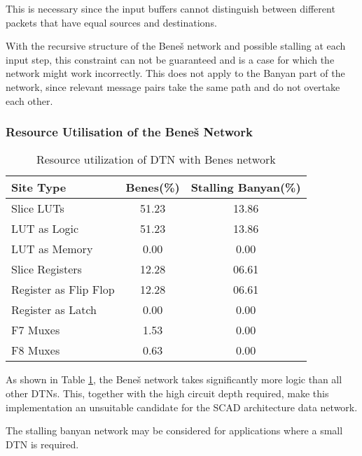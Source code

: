 	This is necessary since the input buffers cannot distinguish between different packets that have equal sources and destinations.
	
	With the recursive structure of the Beneš network and possible stalling at each input step, this constraint can not be guaranteed and is a case for which the network might work incorrectly.
	This does not apply to the Banyan part of the network, since relevant message pairs take the same path and do not overtake each other.
	
\subsubsection{Resource Utilisation of the Beneš Network}
	\label{sec:benes_resource_utilisation}
	\begin{table}[!ht]
		
		\begin{center}
			\begin{tabular}{l | c | c }
				\textbf{Site Type}  & \textbf{Benes(\%)}&\textbf{Stalling Banyan(\%)} \\
				\hline \hline
				Slice LUTs          & 51.23             & 13.86 \\
				\quad LUT as Logic  & 51.23             & 13.86 \\
				\quad LUT as Memory & 0.00              & 0.00  \\
				Slice Registers     & 12.28             & 06.61 \\
				\quad Register as Flip Flop & 12.28     & 06.61 \\
				\quad Register as Latch     & 0.00      & 0.00  \\
				F7 Muxes                    & 1.53      & 0.00  \\
				F8 Muxes                    & 0.63      & 0.00 \\
			\end{tabular}
		\end{center}
		\caption{Resource utilization of DTN with Benes network}
		\label{fig:benes_utilisation}
	\end{table}
	
	As shown in Table \ref{fig:benes_utilisation}, the Beneš network takes significantly more logic than all other DTNs.
	This, together with the high circuit depth required, make this implementation an unsuitable candidate for the SCAD architecture data network.
	
	The stalling banyan network may be considered for applications where a small DTN is required.

